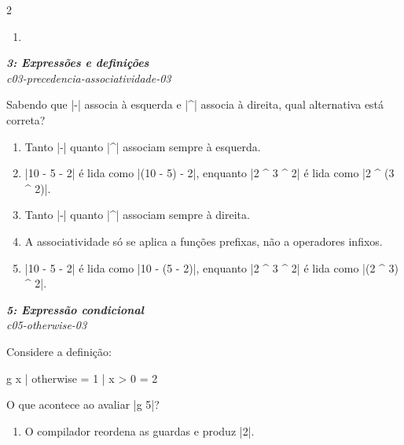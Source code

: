 \documentclass[a4paper,10pt,brazil]{article}
\begin{document}
\begin{multicols}{2}
\begin{enumerate}
  \item \haskellinline{ [3,6,12,24] }


\end{enumerate}

\begin{flushright}
  \footnotesize
  \textit{\textbf{3: Expressões e definições}}\\
  \textit{c03-precedencia-associatividade-03}\\

\end{flushright}
Sabendo que \haskellinline|-| associa à esquerda e \haskellinline|^| associa à direita, qual alternativa está correta?

\begin{enumerate}
  \item Tanto \haskellinline|-| quanto \haskellinline|^| associam sempre à esquerda.

  \item \haskellinline|10 - 5 - 2| é lida como \haskellinline|(10 - 5) - 2|, enquanto \haskellinline|2 ^ 3 ^ 2| é lida como \haskellinline|2 ^ (3 ^ 2)|.

  \item Tanto \haskellinline|-| quanto \haskellinline|^| associam sempre à direita.

  \item A associatividade só se aplica a funções prefixas, não a operadores infixos.

  \item \haskellinline|10 - 5 - 2| é lida como \haskellinline|10 - (5 - 2)|, enquanto \haskellinline|2 ^ 3 ^ 2| é lida como \haskellinline|(2 ^ 3) ^ 2|.


\end{enumerate}

\begin{flushright}
  \footnotesize
  \textit{\textbf{5: Expressão condicional}}\\
  \textit{c05-otherwise-03}\\

\end{flushright}
Considere a definição:
\begin{haskellcode}
g x
  | otherwise = 1
  | x > 0     = 2
\end{haskellcode}
O que acontece ao avaliar \haskellinline|g 5|?

\begin{enumerate}
  \item O compilador reordena as guardas e produz \haskellinline|2|.


\end{enumerate}
\end{multicols}
\end{document}
